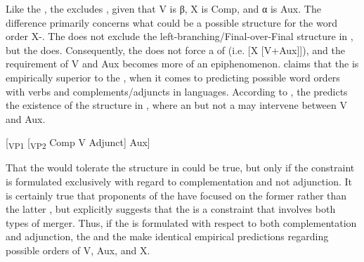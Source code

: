 \documentclass[output=paper, colorlinks, citecolor=brown]{langscibook}
\begin{document}
Like the , the  excludes , given that V is β, X is Comp, and α is Aux. The difference primarily concerns what could be a possible structure for the word order X-. The  does not exclude the left-branching/Final-over-Final structure in , but the  does. Consequently, the  does not force a  of  (i.e. [X [V+Aux]]), and the  requirement of V and Aux becomes more of an epiphenomenon. \citet[132--133]{Haider2013} claims that the  is empirically superior to the , when it comes to predicting possible word orders with verbs and complements\slash adjuncts in  languages. According to \citet[133]{Haider2013}, the  predicts the existence of the structure in , where an  but not a  may intervene between V and Aux.


\ea {}[\textsubscript{VP1} [\textsubscript{VP2} {Comp} {V} {Adjunct}] {Aux}]\label{ex:sangfelt:10}\z


That the  would tolerate the structure in  could be true, but only if the constraint is formulated exclusively with regard to complementation and not adjunction. It is certainly true that proponents of the  have focused on the former rather than the latter \citep[97]{Sheehan2017Final}, but \citet{Sheehan2017Final} explicitly suggests that the  is a constraint that involves both types of merger. Thus, if the  is formulated with respect to both complementation and adjunction, the  and the  make identical empirical predictions regarding possible orders of V, Aux, and X.
\end{document}
